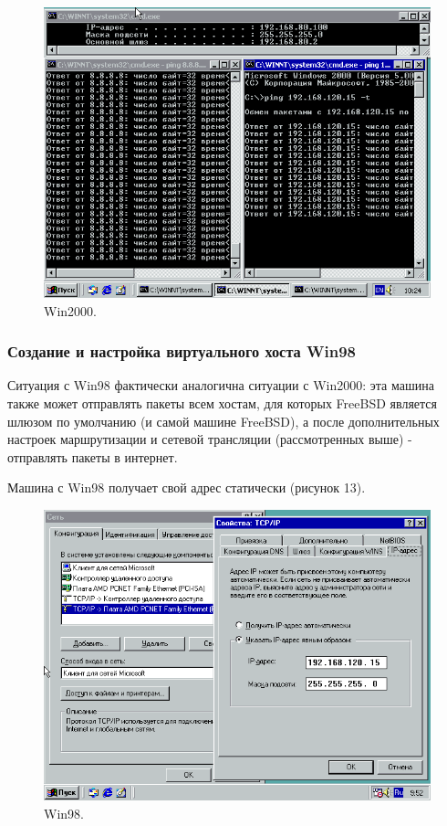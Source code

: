 \begin{figure}[h!]
\centering
\includegraphics[scale=1]{res/win2000-general}
\caption{Win2000.}
\end{figure}

\subsubsection{Создание и настройка виртуального хоста Win98}

Ситуация с Win98 фактически аналогична ситуации с Win2000: эта машина также может отправлять пакеты всем хостам, для которых FreeBSD является шлюзом по умолчанию (и самой машине FreeBSD), а после дополнительных настроек маршрутизации и сетевой трансляции (рассмотренных выше) - отправлять пакеты в интернет.

Машина с Win98 получает свой адрес статически (рисунок 13).

\begin{figure}[h!]
\centering
\includegraphics[scale=0.9]{res/win98-general}
\caption{Win98.}
\end{figure}
